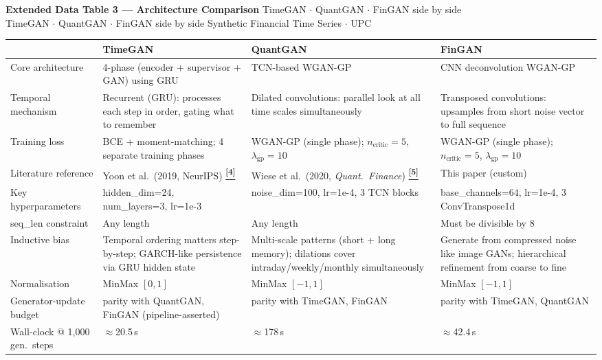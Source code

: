 \documentclass[10pt]{article}
\newcommand{\pagehead}[2]{%
  \begin{tcolorbox}[enhanced,arc=0pt,outer arc=0pt,boxrule=0pt,
    colback=Navy,colframe=Navy,
    top=5pt,bottom=5pt,left=8pt,right=8pt,
    before skip=0pt,after skip=10pt]
  {\color{white}\large\bfseries #1}%
  \ifx\relax#2\relax\else\\[1pt]{\color{blue!30!white}\small #2}\fi
  \hfill{\color{blue!20!white}\footnotesize Synthetic Financial Time Series $\cdot$ UPC}
  \end{tcolorbox}}
\newcommand{\tcite}[1]{%
  \hyperlink{R:#1}{\textsuperscript{\scriptsize\textbf{[#1]}}}}
\begin{document}
\clearpage

\pagehead{Extended Data Table 3 --- Architecture Comparison}
         {TimeGAN $\cdot$ QuantGAN $\cdot$ FinGAN side by side}

\vspace{4pt}
{\small
\begin{tabularx}{\linewidth}{@{}lXXX@{}}
\toprule
 & \textbf{\textcolor{TGcol}{TimeGAN}} & \textbf{\textcolor{QGcol}{QuantGAN}} & \textbf{\textcolor{FGcol}{FinGAN}} \\
\midrule
Core architecture & 4-phase (encoder + supervisor + GAN) using GRU & TCN-based WGAN-GP & CNN deconvolution WGAN-GP \\
Temporal mechanism & Recurrent (GRU): processes each step in order, gating what to remember & Dilated convolutions: parallel look at all time scales simultaneously & Transposed convolutions: upsamples from short noise vector to full sequence \\
Training loss & BCE + moment-matching; 4 separate training phases & WGAN-GP (single phase); $n_\text{critic}=5$, $\lambda_\text{gp}=10$ & WGAN-GP (single phase); $n_\text{critic}=5$, $\lambda_\text{gp}=10$ \\
Literature reference & Yoon et al.\ (2019, NeurIPS)\tcite{4} & Wiese et al.\ (2020, \textit{Quant.\ Finance})\tcite{5} & This paper (custom) \\
Key hyperparameters & hidden\_dim=24, num\_layers=3, lr=1e-3 & noise\_dim=100, lr=1e-4, 3 TCN blocks & base\_channels=64, lr=1e-4, 3 ConvTranspose1d \\
seq\_len constraint & Any length & Any length & Must be divisible by 8 \\
Inductive bias & Temporal ordering matters step-by-step; GARCH-like persistence via GRU hidden state & Multi-scale patterns (short + long memory); dilations cover intraday/weekly/monthly simultaneously & Generate from compressed noise like image GANs; hierarchical refinement from coarse to fine \\
Normalisation & MinMax $[0,1]$ & MinMax $[-1,1]$ & MinMax $[-1,1]$ \\
Generator-update budget & parity with QuantGAN, FinGAN (pipeline-asserted) & parity with TimeGAN, FinGAN & parity with TimeGAN, QuantGAN \\
Wall-clock @ 1,000 gen.\ steps & $\approx$20.5\,s & $\approx$178\,s & $\approx$42.4\,s \\
\bottomrule
\end{tabularx}}
\end{document}
